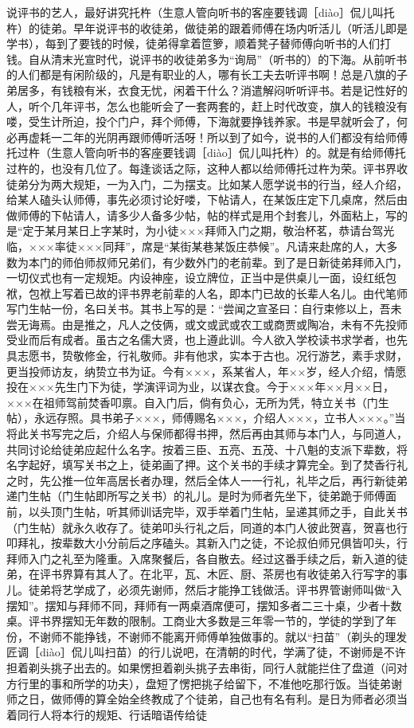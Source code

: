 \documentclass[12pt,UTF8]{ctexbook}
\begin{document}
说评书的艺人，最好讲究托杵（生意人管向听书的客座要钱调［diào］侃儿叫托杵）的徒弟。早年说评书的收徒弟，做徒弟的跟着师傅在场内听活儿（听活儿即是学书），每到了要钱的时候，徒弟得拿着笸箩，顺着凳子替师傅向听书的人们打钱。自从清末光宣时代，说评书的收徒弟多为“询局”（听书的）的下海。从前听书的人们都是有闲阶级的，凡是有职业的人，哪有长工夫去听评书啊！总是八旗的子弟居多，有钱粮有米，衣食无忧，闲着干什么？消遣解闷听听评书。若是记性好的人，听个几年评书，怎么也能听会了一套两套的，赶上时代改变，旗人的钱粮没有喽，受生计所迫，投个门户，拜个师傅，下海就要挣钱养家。书是早就听会了，何必再虚耗一二年的光阴再跟师傅听活呀！所以到了如今，说书的人们都没有给师傅托过杵（生意人管向听书的客座要钱调［diào］侃儿叫托杵）的。就是有给师傅托过杵的，也没有几位了。每逢谈话之际，这种人都以给师傅托过杵为荣。评书界收徒弟分为两大规矩，一为入门，二为摆支。比如某人愿学说书的行当，经人介绍，给某人磕头认师傅，事先必须讨论好喽，下帖请人，在某饭庄定下几桌席，然后由做师傅的下帖请人，请多少人备多少帖，帖的样式是用个封套儿，外面粘上，写的是“定于某月某日上字某时，为小徒×××拜师入门之期，敬治杯茗，恭请台驾光临，×××率徒×××同拜”，席是“某街某巷某饭庄恭候”。凡请来赴席的人，大多数为本门的师伯师叔师兄弟们，有少数外门的老前辈。到了是日新徒弟拜师入门，一切仪式也有一定规矩。内设神座，设立牌位，正当中是供桌儿一面，设红纸包袱，包袱上写着已故的评书界老前辈的人名，即本门已故的长辈人名儿。由代笔师写门生帖一份，名曰关书。其书上写的是：“尝闻之宣圣曰：自行束修以上，吾未尝无诲焉。由是推之，凡人之伎俩，或文或武或农工或商贾或陶冶，未有不先投师受业而后有成者。虽古之名儒大贤，也上遵此训。今人欲入学校读书求学者，也先具志愿书，贽敬修金，行礼敬师。非有他求，实本于古也。况行游艺，素手求财，更当投师访友，纳贽立书为证。今有×××，系某省人，年××岁，经人介绍，情愿投在×××先生门下为徒，学演评词为业，以谋衣食。今于×××年××月××日，×××在祖师驾前焚香叩禀。自入门后，倘有负心，无所为凭，特立关书（门生帖），永远存照。具书弟子×××，师傅赐名×××，介绍人×××，立书人×××。”当将此关书写完之后，介绍人与保师都得书押，然后再由其师与本门人，与同道人，共同讨论给徒弟应起什么名字。按着三臣、五亮、五茂、十八魁的支派下辈数，将名字起好，填写关书之上，徒弟画了押。这个关书的手续才算完全。到了焚香行礼之时，先公推一位年高居长者办理，然后全体人一一行礼，礼毕之后，再行新徒弟递门生帖（门生帖即所写之关书）的礼儿。是时为师者先坐下，徒弟跪于师傅面前，以头顶门生帖，听其师训话完毕，双手举着门生帖，呈递其师之手，自此关书（门生帖）就永久收存了。徒弟叩头行礼之后，同道的本门人彼此贺喜，贺喜也行叩拜礼，按辈数大小分前后之序磕头。其新入门之徒，不论叔伯师兄俱皆叩头，行拜师入门之礼至为隆重。入席聚餐后，各自散去。经过这番手续之后，新入道的徒弟，在评书界算有其人了。在北平，瓦、木匠、厨、茶房也有收徒弟入行写字的事儿。徒弟将艺学成了，必须先谢师，然后才能挣工钱做活。评书界管谢师叫做“入摆知”。摆知与拜师不同，拜师有一两桌酒席便可，摆知多者二三十桌，少者十数桌。评书界摆知无年数的限制。工商业大多数是三年零一节的，学徒的学到了年份，不谢师不能挣钱，不谢师不能离开师傅单独做事的。就以“扫苗”（剃头的理发匠调［diào］侃儿叫扫苗）的行儿说吧，在清朝的时代，学满了徒，不谢师是不许担着剃头挑子出去的。如果愣担着剃头挑子去串街，同行人就能拦住了盘道（问对方行里的事和所学的功夫），盘短了愣把挑子给留下，不准他吃那行饭。当徒弟谢师之日，做师傅的算全始全终教成了个徒弟，自己也有名有利。是日为师者必须当着同行人将本行的规矩、行话暗语传给徒
\end{document}

